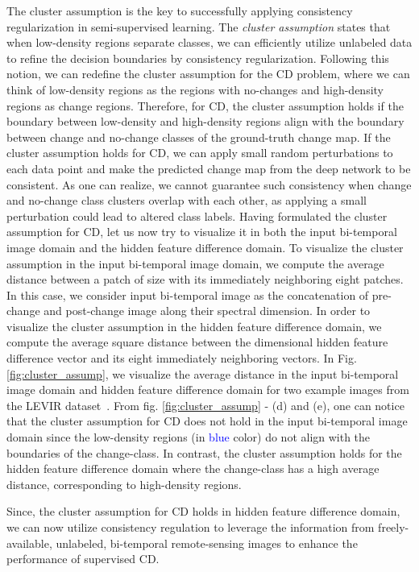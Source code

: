 \documentclass[runningheads]{llncs}
\begin{document}
The cluster assumption is the key to successfully applying consistency regularization in semi-supervised learning. The \textit{cluster assumption} states that when low-density regions separate classes, we can efficiently utilize unlabeled data to refine the decision boundaries by consistency regularization. Following this notion, we can redefine the cluster assumption for the CD problem, where we can think of low-density regions as the regions with no-changes and high-density regions as change regions. Therefore, for CD, the cluster assumption holds if the boundary between low-density and high-density regions align with the boundary between change and no-change classes of the ground-truth change map. If the cluster assumption holds for CD, we can apply small random perturbations to each data point and make the predicted change map from the deep network to be consistent. As one can realize, we cannot guarantee such consistency when change and no-change class clusters overlap with each other, as applying a small perturbation could lead to altered class labels. Having formulated the cluster assumption for CD, let us now try to visualize it in both the input bi-temporal image domain and the hidden feature difference domain. To visualize the cluster assumption in the input bi-temporal image domain, we compute the average  distance between a patch of size  with its immediately neighboring eight patches. In this case, we consider input bi-temporal image  as the concatenation of pre-change  and post-change image  along their spectral dimension. In order to visualize the cluster assumption in the hidden feature difference domain, we compute the average square distance between the dimensional hidden feature difference vector and its eight immediately neighboring vectors. In Fig. \ref{fig:cluster_assump}, we visualize the average  distance in the input bi-temporal image domain and hidden feature difference domain for two example images from the LEVIR dataset~\cite{levid-cd}. From fig. \ref{fig:cluster_assump} - (d) and (e), one can notice that the cluster assumption for CD does not hold in the input bi-temporal image domain since the low-density regions (in \textcolor{blue}{blue} color) do not align with the boundaries of the change-class. In contrast, the cluster assumption holds for the hidden feature difference domain where the change-class has a high average distance, corresponding to high-density regions.

Since, the cluster assumption for CD holds in hidden feature difference domain, we can now utilize consistency regulation to leverage the information from freely-available, unlabeled, bi-temporal remote-sensing images to enhance the performance of supervised CD.
\vspace{-4mm}
\end{document}
